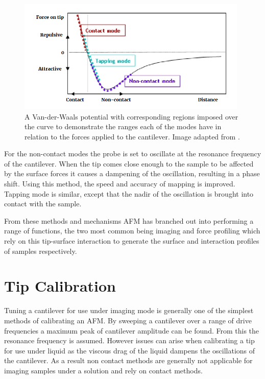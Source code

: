 \begin{figure}[h!!!]     %
        \begin{center}
          \includegraphics[width=110mm]{chapter2/Regions.png}
\end{center}
\caption{A Van-der-Waals potential with corresponding regions imposed over the curve to demonstrate the ranges each of the modes have in relation to the forces applied to the cantilever. Image adapted from \cite{GoodAFM}.}
\label{fig:Regions}                 %
\end{figure}

For the non-contact modes the probe is set to oscillate at the resonance frequency of the cantilever. When the tip comes close enough to the sample to be affected by the surface forces it causes a dampening of the oscillation, resulting in a phase shift. Using this method, the speed and accuracy of mapping is improved. Tapping mode is similar, except that the nadir of the oscillation is brought into contact with the sample.

From these methods and mechanisms AFM has branched out into performing a range of functions, the two most common being imaging and force profiling which rely on this tip-surface interaction to generate the surface and interaction profiles of samples respectively.

\section{Tip Calibration}
\label{chap:cali}

Tuning a cantilever for use under imaging mode is generally one of the simplest methods of calibrating an AFM. By sweeping a cantilever over a range of drive frequencies a maximum peak of cantilever amplitude can be found. From this the resonance frequency is assumed. However issues can arise when calibrating a tip for use under liquid as the viscous drag of the liquid dampens the oscillations of the cantilever. As a result non contact methods are generally not applicable for imaging samples under a solution and rely on contact methods.

